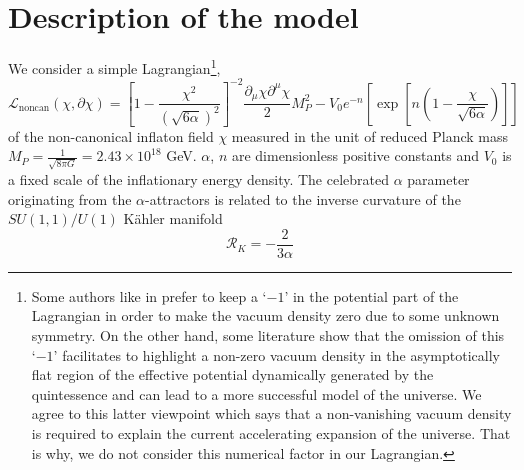 \documentclass[a4paper,11pt]{article}
\begin{document}
\section{Description of the model}
\label{sec:our model}
We consider a simple Lagrangian\footnote{Some authors like in \cite{Dimopoulos:2017zvq,Dimopoulos:2017tud} prefer to keep a `$-1$' in the potential part of the Lagrangian in order to make the vacuum density zero due to some unknown symmetry. On the other hand, some literature \cite{AresteSalo:2021wgb,Guendelman:2002js,Guendelman:2014bva} show that the omission of this `$-1$' facilitates to highlight a non-zero vacuum density in the asymptotically flat region of the effective potential dynamically generated by the quintessence and can lead to a more successful model of the universe. We agree to this latter viewpoint which says that a non-vanishing vacuum density is required to explain the current accelerating expansion of the universe. That is why, we do not consider this numerical factor in our Lagrangian.},
\begin{equation}
    \mathcal{L}_{\mathrm{noncan}}(\chi, \partial\chi)=\left[1-\frac{\chi^2}{(\sqrt{6\alpha})^2}\right]^{-2}\frac{\partial_\mu\chi\partial^\mu\chi}{2}M^2_P-V_0 e^{-n}\left[\exp\left[n\left(1-\frac{\chi}{\sqrt{6\alpha}}\right)\right]\right]
    \label{eq:Eq1}
\end{equation}
of the non-canonical inflaton field $\chi$ measured in the unit of reduced Planck mass $M_P = \frac{1}{\sqrt{8\pi G}} = 2.43\times 10^{18}$ GeV. $\alpha$, $n$ are dimensionless positive constants and $V_0$ is a fixed scale of the inflationary energy density. The celebrated $\alpha$ parameter originating from the $\alpha$-attractors \cite{Kallosh:2013yoa,Ferrara:2013rsa,Kallosh:2013pby,Kallosh:2013maa,Kallosh:2015lwa,Carrasco:2015pla,Kallosh:2013hoa,Maeda:2018sje,Kallosh:2014rga,Galante:2014ifa,Kallosh:2013tua,Ferrara:2013kca} is related to the inverse curvature of the $SU(1,1)/U(1)$ K\"{a}hler manifold
\begin{equation}
    \mathcal{R}_K = -\frac{2}{3\alpha}
    \label{eq:Eq2}
\end{equation}
\end{document}
